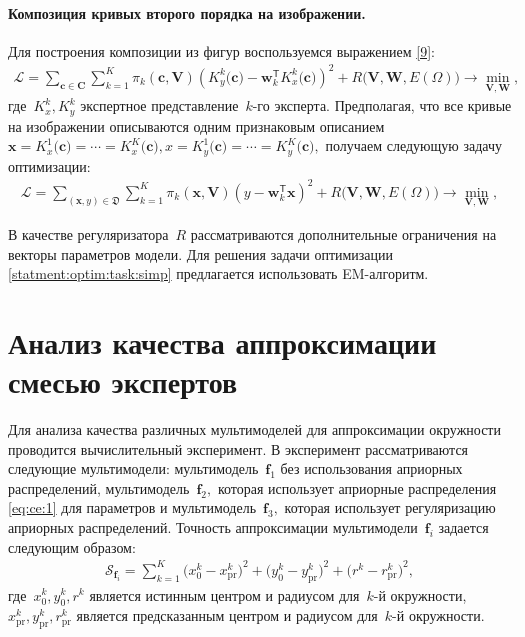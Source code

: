\paragraph{Композиция кривых второго порядка на изображении.}
\label{sec:4}
Для построения композиции из фигур воспользуемся выражением \eqref{9}:
\[ 
\label{statment:optim:task}
\begin{aligned}
\mathcal{L} = \sum\limits_{\mathbf{c} \in \mathbf{C}} \sum\limits_{k = 1}^{K} \pi_k(\mathbf{c}, \mathbf{V})\left(K^{k}_y\bigr(\mathbf{c}\bigr) - \mathbf{w}_k^{\mathsf{T}}K^{k}_x\bigr(\mathbf{c}\bigr)\right)^2 + R\bigl(\mathbf{V}, \mathbf{W}, E(\Omega)\bigr) \rightarrow \min_{\mathbf{V}, \mathbf{W}},
\end{aligned}
\] 
где~$K^{k}_x, K^{k}_y$ экспертное представление~$k$-го эксперта. Предполагая, что все кривые на изображении описываются одним признаковым описанием~$\mathbf{x} =K^{1}_x\bigr(\mathbf{c}\bigr)=\cdots=K^{K}_x\bigr(\mathbf{c}\bigr), x= K^{1}_y\bigr(\mathbf{c}\bigr)=\cdots=K^{K}_y\bigr(\mathbf{c}\bigr),$ получаем следующую задачу оптимизации:
\[ 
\label{statment:optim:task:simp}
\begin{aligned}
\mathcal{L} = \sum\limits_{\left(\mathbf{x}, y\right) \in \mathfrak{D}} \sum\limits_{k = 1}^{K} \pi_k(\mathbf{x}, \mathbf{V})\left(y - \mathbf{w}_k^{\mathsf{T}}\mathbf{x}\right)^2 + R\bigl(\mathbf{V}, \mathbf{W}, E(\Omega)\bigr) \rightarrow \min_{\mathbf{V}, \mathbf{W}},
\end{aligned}
\] 

В качестве регуляризатора~$R$ рассматриваются дополнительные ограничения на векторы параметров модели. Для решения задачи оптимизации \eqref{statment:optim:task:simp} предлагается использовать EM-алгоритм.

\section{Анализ качества аппроксимации смесью экспертов}
Для анализа качества различных мультимоделей для аппроксимации окружности проводится вычислительный эксперимент.
В эксперимент рассматриваются следующие мультимодели: мультимодель~$\textbf{f}_1$ без использования априорных распределений, мультимодель~$\textbf{f}_2,$ которая использует априорные распределения \eqref{eq:ce:1} для параметров и мультимодель~$\textbf{f}_3,$ которая использует регуляризацию априорных распределений.
Точность аппроксимации мультимодели~$\textbf{f}_i$ задается следующим образом:
\[
\label{eq:ce:ex:0:1}
\begin{aligned}
\mathcal{S}_{\textbf{f}_i} = \sum_{k=1}^{K}\bigr(x^{k}_{0}-x^{k}_{\text{pr}}\bigr)^2+\bigr(y^{k}_{0}-y^{k}_{\text{pr}}\bigr)^2+\bigr(r^{k}-r^{k}_{\text{pr}}\bigr)^2,
\end{aligned}
\]
где~$x^{k}_0, y^{k}_0, r^{k}$ является истинным центром и радиусом для~$k$-й окружности,~$x^{k}_{\text{pr}}, y^{k}_{\text{pr}}, r^{k}_{\text{pr}}$ является предсказанным центром и радиусом для~$k$-й окружности.

